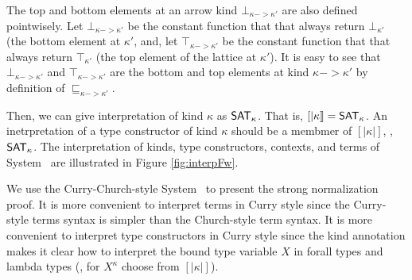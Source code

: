 The top and bottom elements at an arrow kind $\bot_{\kappa -> \kappa'}$
are also defined pointwisely. Let $\bot_{\kappa -> \kappa'}$ be
the constant function that that always return $\bot_{\kappa'}$
(the bottom element at $\kappa'$, and, let $\top_{\kappa -> \kappa'}$ be
the constant function that that always return $\top_{\kappa'}$
(the top element of the lattice at $\kappa'$). It is easy to see that
$\bot_{\kappa -> \kappa'}$ and $\top_{\kappa -> \kappa'}$
are the bottom and top elements at kind $\kappa -> \kappa'$
by definition of $\sqsubseteq_{\kappa -> \kappa'}$.

Then, we can give interpretation of kind $\kappa$ as $\mathsf{SAT}_\kappa$.
That is, $[| \kappa |] = \mathsf{SAT}_\kappa$. An inetrpretation of a type constructor
of kind $\kappa$ should be a membmer of $[| \kappa |]$, \ie, $\mathsf{SAT}_\kappa$.
The interpretation of kinds, type constructors, contexts, and
terms of System \Fw\ are illustrated in Figure \ref{fig:interpFw}. 

We use the Curry-Church-style System \Fw\ to present the strong normalization
proof. It is more convenient to interpret terms in Curry style since
the Curry-style terms syntax is simpler than the Church-style term syntax.
It is more convenient to interpret type constructors in Curry style since
the kind annotation makes it clear how to interpret the bound type variable $X$
in forall types and lambda types (\ie, for $X^\kappa$ choose from $[|\kappa|]$).

